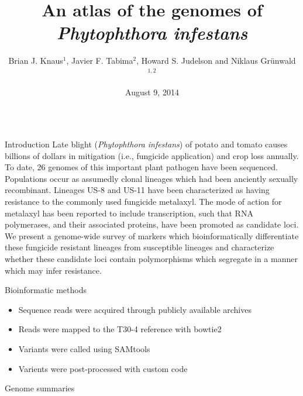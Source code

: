 \documentclass[final,t]{beamer}
\title{\huge An atlas of the genomes of \emph{Phytophthora infestans}}
\author[Knaus et al.]{Brian J. Knaus$^{1}$, Javier F. Tabima$^{2}$, Howard S. Judelson and Niklaus Gr\"{u}nwald$^{1, 2}$}
\institute[USDA-ARS, OSU, UCR]{$^{1}$Horticultural Crops Research Unit, USDA Agricultural Research Service; $^{2}$Botany and Plant Pathology, Oregon State University}
\date[August 9, 2014]{August 9, 2014}
\begin{document}
\begin{frame}{} 
  \begin{columns}[t]
    \begin{column}{.28\linewidth}


      \begin{block}{Introduction}
Late blight (\emph{Phytophthora infestans}) of potato and tomato causes billions of dollars in mitigation (i.e., fungicide application) and crop loss annually.  To date, 26 genomes of this important plant pathogen have been sequenced.  Populations occur as assumedly clonal lineages which had been anciently sexually recombinant.  Lineages US-8 and US-11 have been characterized as having resistance to the commonly used fungicide metalaxyl.  The mode of action for metalaxyl has been reported to include transcription, such that RNA polymerases, and their associated proteins, have been promoted as candidate loci.  We present a genome-wide survey of markers which bioinformatically differentiate these fungicide resistant lineages from susceptible lineages and characterize whether these candidate loci contain polymorphisms which segregate in a manner which may infer resistance.
      \end{block}

      
  \begin{block}{Bioinformatic methods}
    \begin{itemize}
      \item Sequence reads were acquired through publicly available archives
      \item Reads were mapped to the T30-4 reference with bowtie2
      \item Variants were called using SAMtools
      \item Varients were post-processed with custom code
    \end{itemize}
  \end{block}

      \begin{block}{Genome summaries}

      \end{block}


\end{column}
\end{columns}
\end{frame}
\end{document}
